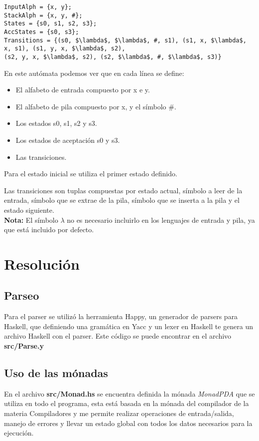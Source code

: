 \documentclass[12pt,a4paper]{article}
\begin{document}
\begin{lstlisting}
InputAlph = {x, y};
StackAlph = {x, y, #};
States = {s0, s1, s2, s3};
AccStates = {s0, s3};
Transitions = {(s0, $\lambda$, $\lambda$, #, s1), (s1, x, $\lambda$, x, s1), (s1, y, x, $\lambda$, s2),
(s2, y, x, $\lambda$, s2), (s2, $\lambda$, #, $\lambda$, s3)}
\end{lstlisting}


En este autómata podemos ver que en cada línea se define:
\begin{itemize}
  \item El alfabeto de entrada compuesto por x e y.
  \item El alfabeto de pila compuesto por x, y el símbolo \#.
  \item Los estados s0, s1, s2 y s3.
  \item Los estados de aceptación s0 y s3.
  \item Las transiciones.
\end{itemize}

Para el estado inicial se utiliza el primer estado definido.

Las transiciones son tuplas compuestas por estado actual, símbolo a leer de la entrada,
símbolo que se extrae de la pila, símbolo que se inserta a la pila y el estado siguiente. \\


\textbf{Nota:} El símbolo $\lambda$ no es necesario incluirlo en los lenguajes de entrada y pila,
ya que está incluido por defecto.

\newpage

\section{Resolución}
\subsection{Parseo}
Para el parser se utilizó la herramienta Happy, un generador de parsers para Haskell,
que definiendo una gramática en Yacc y un lexer en Haskell te genera un archivo Haskell
con el parser. Este código se puede encontrar en el archivo \textbf{src/Parse.y}

\subsection{Uso de las mónadas}
En el archivo \textbf{src/Monad.hs} se encuentra definida la mónada \emph{MonadPDA}
que se utiliza en todo el programa, esta está basada en la mónada del compilador
de la materia Compiladores y me permite realizar operaciones de entrada/salida,
manejo de errores y llevar un estado global con todos los datos necesarios
para la ejecución.
\end{document}
